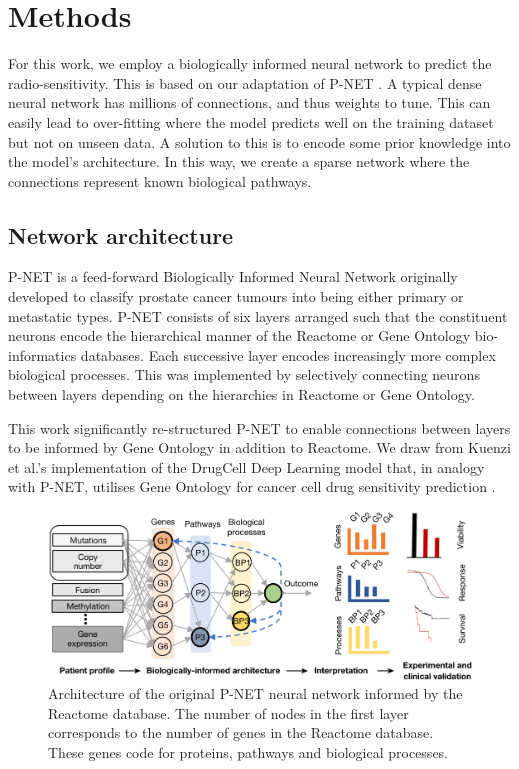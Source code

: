 \documentclass[NOTE, disdraft=true, UKenglish]{\DISCDTLATEXPATH UCLCDTDISdoc}
\begin{document}
\section{Methods}
\label{sec:method}
For this work, we employ a biologically informed neural network to predict the radio-sensitivity. This is based on our adaptation of P-NET \cite{cosmin_thesis}. A typical dense neural network has millions of connections, and thus weights to tune. This can easily lead to over-fitting where the model predicts well on the training dataset but not on unseen data. A solution to this is to encode some prior knowledge into the model's architecture. In this way, we create a sparse network where the connections represent known biological pathways.

\subsection{Network architecture}
P-NET is a feed-forward Biologically Informed Neural Network originally developed to classify prostate cancer tumours into being either primary or metastatic types. P-NET consists of six layers arranged such that the constituent neurons encode the hierarchical manner of the Reactome or Gene Ontology bio-informatics databases. Each successive layer encodes increasingly more complex biological processes. This was implemented by selectively connecting neurons between layers depending on the hierarchies in Reactome or Gene Ontology.

This work significantly re-structured P-NET to enable connections between layers to be informed by Gene Ontology in addition to Reactome. We draw from Kuenzi et al.'s implementation of the DrugCell Deep Learning model that, in analogy with P-NET, utilises Gene Ontology for cancer cell drug sensitivity prediction \cite{kuenzi_predicting_2020}.

\begin{figure}
    \centering
    \includegraphics[width=\linewidth]{Figures/pnet_architecture.png}
    \caption{Architecture of the original P-NET neural network \cite{elmarakeby_biologically_2021} informed by the Reactome database. The number of nodes in the first layer corresponds to the number of genes in the Reactome database. These genes code for proteins, pathways and biological processes.}
    \label{fig:1}
\end{figure}
\end{document}
